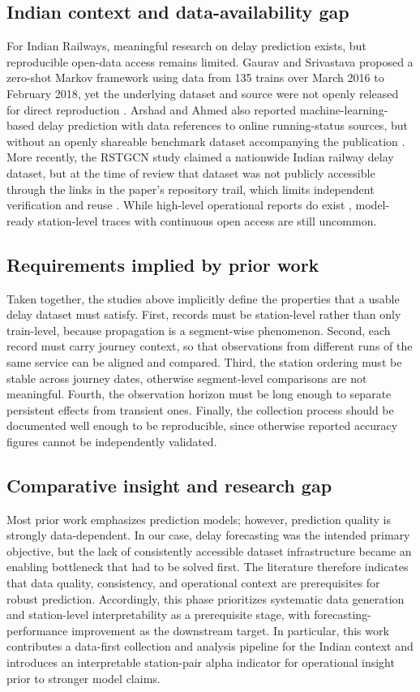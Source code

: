 \documentclass[a4paper,fleqn]{cas-dc}
\begin{document}
\subsection{Indian context and data-availability gap}
For Indian Railways, meaningful research on delay prediction exists, but
reproducible open-data access remains limited. Gaurav and Srivastava proposed
a zero-shot Markov framework using data from 135 trains over March 2016 to
February 2018, yet the underlying dataset and source were not openly released
for direct reproduction \citep{gaurav2018zeroshot}. Arshad and Ahmed also
reported machine-learning-based delay prediction with data references to
online running-status sources, but without an openly shareable benchmark
dataset accompanying the publication \citep{arshad2019prediction}. More
recently, the RSTGCN study claimed a nationwide Indian railway delay dataset,
but at the time of review that dataset was not publicly accessible through
the links in the paper's repository trail, which limits independent
verification and reuse \citep{chowdhury2025rstgcn}. While high-level
operational reports do exist \citep{indian_railways_stats}, model-ready
station-level traces with continuous open access are still uncommon.

\subsection{Requirements implied by prior work}
Taken together, the studies above implicitly define the properties that a
usable delay dataset must satisfy. First, records must be station-level
rather than only train-level, because propagation is a segment-wise
phenomenon. Second, each record must carry journey context, so that
observations from different runs of the same service can be aligned and
compared. Third, the station ordering must be stable across journey dates,
otherwise segment-level comparisons are not meaningful. Fourth, the
observation horizon must be long enough to separate persistent effects from
transient ones. Finally, the collection process should be documented well
enough to be reproducible, since otherwise reported accuracy figures cannot
be independently validated.

\subsection{Comparative insight and research gap}
Most prior work emphasizes prediction models; however, prediction quality is
strongly data-dependent. In our case, delay forecasting was the intended
primary objective, but the lack of consistently accessible dataset
infrastructure became an enabling bottleneck that had to be solved first. The
literature therefore indicates that data quality, consistency, and
operational context are prerequisites for robust prediction. Accordingly,
this phase prioritizes systematic data generation and station-level
interpretability as a prerequisite stage, with forecasting-performance
improvement as the downstream target. In particular, this work contributes a
data-first collection and analysis pipeline for the Indian context and
introduces an interpretable station-pair alpha indicator for operational
insight prior to stronger model claims.
\end{document}
